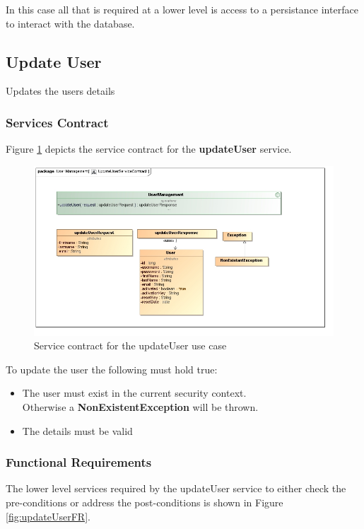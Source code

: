 In this case all that is required at a lower level is access to a persistance
interface to interact with the database.

\subsection{Update User}
Updates the users details

\subsubsection{Services Contract}
Figure \ref{fig:updateUserServicesContract} depicts the service
contract for the \textbf{updateUser} service.

\begin{figure}[H]
	\begin{center}
		\includegraphics[scale=0.55]{../Diagrams and Charts/Users/UpdateUserServiceContract.jpg}
		\caption{Service contract for the updateUser use case}
		\label{fig:updateUserServicesContract}
	\end{center}
\end{figure}

To update the user the following must hold true:
\begin{itemize}
	\item The user must exist in the current security context.\\
	Otherwise a \textbf{NonExistentException} will be thrown.
	\item The details must be valid
\end{itemize}

\subsubsection{Functional Requirements}
The lower level services required by the updateUser service
to either check the pre-conditions or address the post-conditions is shown
in Figure \ref{fig:updateUserFR}.

